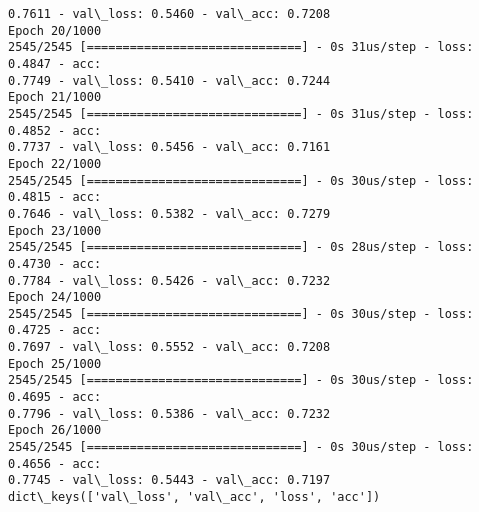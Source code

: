 \documentclass[11pt]{article}
\begin{document}
\begin{Verbatim}[commandchars=\\\{\}]
0.7611 - val\_loss: 0.5460 - val\_acc: 0.7208
Epoch 20/1000
2545/2545 [==============================] - 0s 31us/step - loss: 0.4847 - acc:
0.7749 - val\_loss: 0.5410 - val\_acc: 0.7244
Epoch 21/1000
2545/2545 [==============================] - 0s 31us/step - loss: 0.4852 - acc:
0.7737 - val\_loss: 0.5456 - val\_acc: 0.7161
Epoch 22/1000
2545/2545 [==============================] - 0s 30us/step - loss: 0.4815 - acc:
0.7646 - val\_loss: 0.5382 - val\_acc: 0.7279
Epoch 23/1000
2545/2545 [==============================] - 0s 28us/step - loss: 0.4730 - acc:
0.7784 - val\_loss: 0.5426 - val\_acc: 0.7232
Epoch 24/1000
2545/2545 [==============================] - 0s 30us/step - loss: 0.4725 - acc:
0.7697 - val\_loss: 0.5552 - val\_acc: 0.7208
Epoch 25/1000
2545/2545 [==============================] - 0s 30us/step - loss: 0.4695 - acc:
0.7796 - val\_loss: 0.5386 - val\_acc: 0.7232
Epoch 26/1000
2545/2545 [==============================] - 0s 30us/step - loss: 0.4656 - acc:
0.7745 - val\_loss: 0.5443 - val\_acc: 0.7197
dict\_keys(['val\_loss', 'val\_acc', 'loss', 'acc'])
\end{Verbatim}

    \begin{center}
    \end{center}
    { \hspace*{\fill} \\}
    
\end{document}
